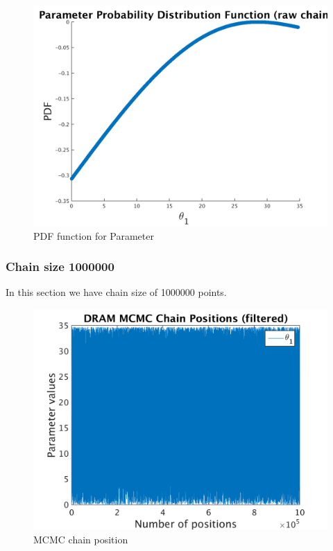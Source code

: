 \begin{figure}[h!]
  
  \centering
   \includegraphics[scale=0.75]{output_900000/ip_logLike_unified}
   \caption{PDF function for Parameter }
\end{figure}


\subsubsection{Chain size 1000000 }
In this section we have chain size of 1000000 points. 

\begin{figure}[h!]
  
  \centering
   \includegraphics[scale=0.75]{output_1000000/simple_ip_chain_pos_filt}
   \caption{MCMC chain position }
\end{figure}


